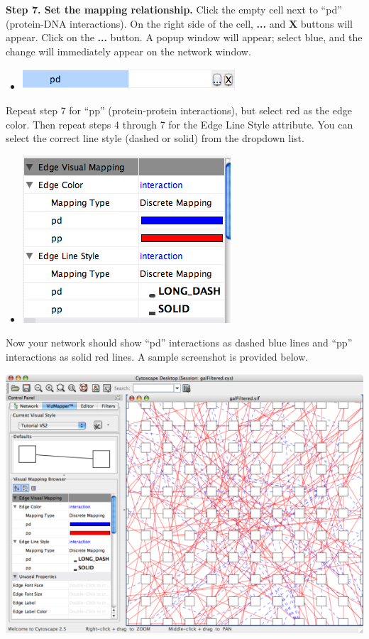  \textbf{Step 7. Set the mapping relationship.}
 Click the empty cell next to ``pd'' (protein-DNA interactions). On the right side of the cell, \textbf{...}
 and \textbf{X}
 buttons will appear. Click on the \textbf{...}
 button. A popup window will appear; select blue, and the change will immediately appear on the network window. 
\begin{itemize}
\item 

 \includegraphics[width=.6\textwidth]{images/CellEditor1.png} 


\end{itemize}


 Repeat step 7 for ``pp'' (protein-protein interactions), but select red as the edge color. Then repeat steps 4 through 7 for the Edge Line Style attribute. You can select the correct line style (dashed or solid) from the dropdown list. 
\begin{itemize}
\item 

 \includegraphics[width=.6\textwidth]{images/EdgeMapping3.png} 


\end{itemize}


 Now your network should show ``pd'' interactions as dashed blue lines and ``pp'' interactions as solid red lines. A sample screenshot is provided below. 


 \includegraphics[width=.6\textwidth]{images/NewVizMapperInteractionsRedBlue.png} 


